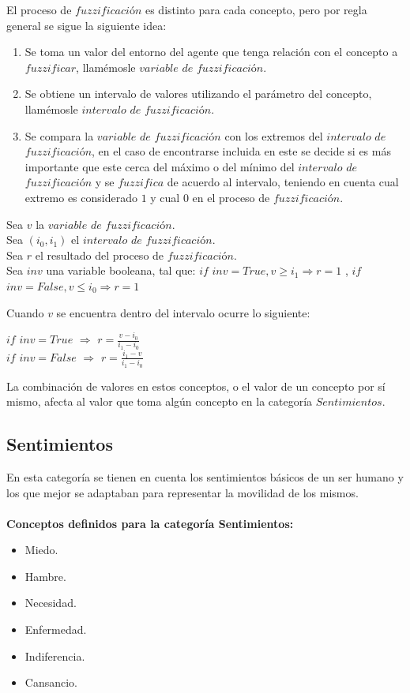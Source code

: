 El proceso de $fuzzificaci$ó$n$ es distinto para cada concepto, pero por regla general se sigue la siguiente idea:\\
\begin{enumerate}
    \item Se toma un valor del entorno del agente que tenga relación con el concepto a $fuzzificar$, llamémosle $variable$ $de$ $fuzzificaci$ó$n$.
    \item Se obtiene un intervalo de valores utilizando el parámetro del concepto, llamémosle $intervalo$ $de$ $fuzzificaci$ó$n$.
    \item Se compara la $variable$ $de$ $fuzzificaci$ó$n$ con los extremos del $intervalo$ $de$ $fuzzificaci$ó$n$, en el caso de encontrarse incluida en este se decide si es más importante que este cerca del máximo o del mínimo del $intervalo$ $de$ $fuzzificaci$ó$n$ y se $fuzzifica$ de acuerdo al intervalo, teniendo en cuenta cual extremo es considerado $1$ y cual $0$ en el proceso de $fuzzificaci$ó$n$.
\end{enumerate}

\begin{center}
    Sea $v$ la $variable$ $de$ $fuzzificaci$ó$n$.\\
    Sea $(i_0, i_1)$ el $intervalo$ $de$ $fuzzificaci$ó$n$.\\
    Sea $r$ el resultado del proceso de $fuzzificaci$ó$n$.\\
    Sea $inv$ una variable booleana, tal que: $if$ $inv = True, v \geq i_1 \Rightarrow r = 1$ , $if$ $inv = False, v \leq i_0 \Rightarrow r = 1$\\
\end{center}
    Cuando $v$ se encuentra dentro del intervalo ocurre lo siguiente:
\begin{center}
    $if$ $inv = True$ $\Rightarrow$ $r = \frac{v - i_0}{i_1 - i_0}$\\
    $if$ $inv = False$ $\Rightarrow$ $r = \frac{i_1 - v}{i_1 - i_0}$
\end{center}

La combinación de valores en estos conceptos, o el valor de un concepto por sí mismo, afecta al valor que toma algún
concepto en la categoría $Sentimientos$.

\subsection{Sentimientos}
En esta categoría se tienen en cuenta los sentimientos básicos de un ser humano y los que mejor se adaptaban para
representar la movilidad de los mismos.\\
\\
\textbf{Conceptos definidos para la categoría Sentimientos:}
\begin{itemize}
    \item Miedo.
    \item Hambre.
    \item Necesidad.
    \item Enfermedad.
    \item Indiferencia.
    \item Cansancio.
\end{itemize}

